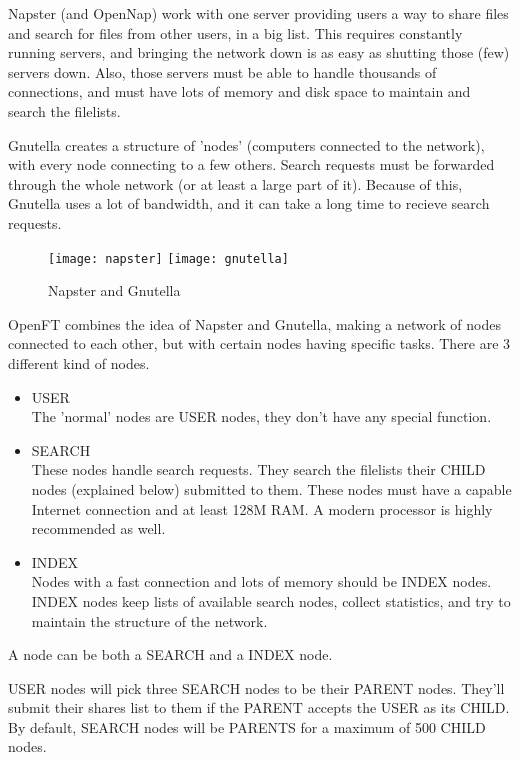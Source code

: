 \documentclass[10pt]{article}
\begin{document}
Napster (and OpenNap) work with one server providing users a way to share files
and search for files from other users, in a big list. This requires constantly
running servers, and bringing the network down is as easy as shutting those
(few) servers down. Also, those servers must be able to handle thousands
of connections, and must have lots of memory and disk space to maintain and
search the filelists.

Gnutella creates a structure of 'nodes' (computers connected to the network),
with every node connecting to a few others. Search requests must be forwarded
through the whole network (or at least a large part of it). Because of this,
Gnutella uses a lot of bandwidth, and it can take a long time to recieve search
requests.

\begin{figure}[bh]
  \begin{center}
    \texttt{[image: napster]}
    \texttt{[image: gnutella]}
  \end{center}
  \caption{Napster and Gnutella}
\end{figure}

OpenFT combines the idea of Napster and Gnutella, making a network of nodes
connected to each other, but with certain nodes having specific tasks. There are
3 different kind of nodes.
\begin{itemize}
\item{USER}\\
The 'normal' nodes are USER nodes, they don't have any special function.
\item{SEARCH}\\
These nodes handle search requests. They search the filelists their CHILD
nodes (explained below) submitted to them. These nodes must have a capable
Internet connection and at least 128M RAM.  A modern processor is highly
recommended as well.
\item{INDEX}\\
Nodes with a fast connection and lots of memory should be INDEX nodes. INDEX
nodes keep lists of available search nodes, collect statistics, and try to
maintain the structure of the network.
\end{itemize}

A node can be both a SEARCH and a INDEX node. 

USER nodes will pick three SEARCH nodes to be their PARENT nodes. They'll
submit their shares list to them if the PARENT accepts the USER as its CHILD.
By default, SEARCH nodes will be PARENTS for a maximum of 500 CHILD nodes.
\end{document}
